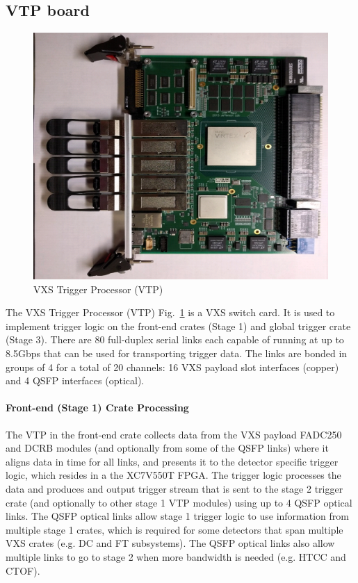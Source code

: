 \subsection{VTP board}

\begin{figure}[hbt]
	\centering
	\includegraphics[width=1.0\columnwidth,keepaspectratio]{img/vtp_board.png}
	\caption{VXS Trigger Processor (VTP)}
	\label{fig:vtp_board}
\end{figure}

The VXS Trigger Processor (VTP) Fig.~\ref{fig:vtp_board} is a VXS switch card. It is used to implement trigger logic on the front-end crates (Stage 1) and global trigger crate (Stage 3). There are 80 full-duplex serial links each capable of running at up to 8.5Gbps that can be used for transporting trigger data. The links are bonded in groups of 4 for a total of 20 channels: 16 VXS payload slot interfaces (copper) and 4 QSFP interfaces (optical).

\paragraph{Front-end (Stage 1) Crate Processing}
The VTP in the front-end crate collects data from the VXS payload FADC250 and DCRB modules (and optionally from some of the QSFP links) where it aligns data in time for all links, and presents it to the detector specific trigger logic, which resides in a the XC7V550T FPGA. The trigger logic processes the data and produces and output trigger stream that is sent to the stage 2 trigger crate (and optionally to other stage 1 VTP modules) using up to 4 QSFP optical links. The QSFP optical links allow stage 1 trigger logic to use information from multiple stage 1 crates, which is required for some detectors that span multiple VXS crates (e.g. DC and FT subsystems). The QSFP optical links also allow multiple links to go to stage 2 when more bandwidth is needed (e.g. HTCC and CTOF).

